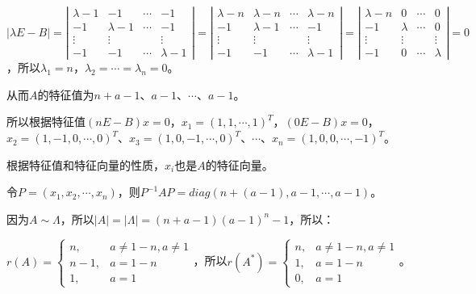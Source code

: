 $\vert\lambda E-B\vert=\left\vert\begin{array}{cccc}
    \lambda-1 & -1 & \cdots & -1 \\
    -1 & \lambda-1 & \cdots & -1 \\
    \vdots & \vdots & & \vdots \\
    -1 & -1 & \cdots & \lambda-1
\end{array}\right\vert=\left\vert\begin{array}{cccc}
    \lambda-n & \lambda-n & \cdots & \lambda-n \\
    -1 & \lambda-1 & \cdots & -1 \\
    \vdots & \vdots & & \vdots \\
    -1 & -1 & \cdots & \lambda-1
\end{array}\right\vert=\left\vert\begin{array}{cccc}
    \lambda-n & 0 & \cdots & 0 \\
    -1 & \lambda & \cdots & 0 \\
    \vdots & \vdots & & \vdots \\
    -1 & 0 & \cdots & \lambda
\end{array}\right\vert=0$，所以$\lambda_1=n$，$\lambda_2=\cdots=\lambda_n=0$。

从而$A$的特征值为$n+a-1$、$a-1$、$\cdots$、$a-1$。

所以根据特征值$(nE-B)x=0$，$x_1=(1,1,\cdots,1)^T$，$(0E-B)x=0$，$x_2=(1,-1,0,\cdots,0)^T$、$x_3=(1,0,-1,\cdots,0)^T$、$\cdots$、$x_n=(1,0,0,\cdots,-1)^T$。

根据特征值和特征向量的性质，$x_i$也是$A$的特征向量。

令$P=(x_1,x_2,\cdots,x_n)$，则$P^{-1}AP=diag(n+(a-1),a-1,\cdots,a-1)$。

因为$A\sim\Lambda$，所以$\vert A\vert=\vert\Lambda\vert=(n+a-1)(a-1)^n-1$，所以：

$r(A)=\left\{\begin{array}{ll}
    n, & a\neq1-n,a\neq1 \\
    n-1, & a=1-n \\
    1, & a=1
\end{array}\right.$，所以$r(A^*)=\left\{\begin{array}{ll}
    n, & a\neq1-n,a\neq1 \\
    1, & a=1-n \\
    0, & a=1
\end{array}\right.$。

\paragraph{}

